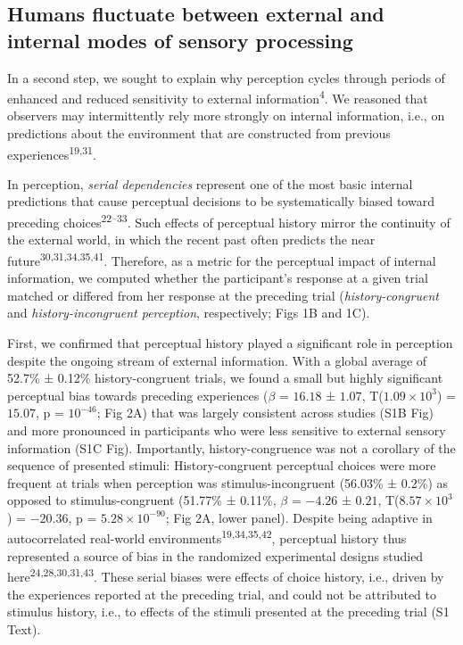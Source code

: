 \documentclass[
]{article}
\begin{document}
\hypertarget{humans-fluctuate-between-external-and-internal-modes-of-sensory-processing}{%
\subsection{Humans fluctuate between external and internal modes of
sensory
processing}\label{humans-fluctuate-between-external-and-internal-modes-of-sensory-processing}}

In a second step, we sought to explain why perception cycles through
periods of enhanced and reduced sensitivity to external
information\textsuperscript{4}. We reasoned that observers may
intermittently rely more strongly on internal information, i.e., on
predictions about the environment that are constructed from previous
experiences\textsuperscript{19,31}.

In perception, \emph{serial dependencies} represent one of the most
basic internal predictions that cause perceptual decisions to be
systematically biased toward preceding choices\textsuperscript{22--33}.
Such effects of perceptual history mirror the continuity of the external
world, in which the recent past often predicts the near
future\textsuperscript{30,31,34,35,41}. Therefore, as a metric for the
perceptual impact of internal information, we computed whether the
participant's response at a given trial matched or differed from her
response at the preceding trial (\emph{history-congruent} and
\emph{history-incongruent perception}, respectively; Figs 1B and 1C).

First, we confirmed that perceptual history played a significant role in
perception despite the ongoing stream of external information. With a
global average of 52.7\% ± 0.12\% history-congruent trials, we found a
small but highly significant perceptual bias towards preceding
experiences (\(\beta\) = \(16.18\) ± \(1.07\),
T(\(\ensuremath{1.09\times 10^{3}}\)) = \(15.07\), p =
\(\ensuremath{10^{-46}}\); Fig 2A) that was largely consistent across
studies (S1B Fig) and more pronounced in participants who
were less sensitive to external sensory information (S1C Fig). Importantly, history-congruence was not a corollary of the sequence
of presented stimuli: History-congruent perceptual choices were more
frequent at trials when perception was stimulus-incongruent (56.03\% ±
0.2\%) as opposed to stimulus-congruent (51.77\% ± 0.11\%, \(\beta\) =
\(-4.26\) ± \(0.21\), T(\(\ensuremath{8.57\times 10^{3}}\)) =
\(-20.36\), p = \(\ensuremath{5.28\times 10^{-90}}\); Fig 2A, lower
panel). Despite being adaptive in autocorrelated real-world
environments\textsuperscript{19,34,35,42}, perceptual history thus
represented a source of bias in the randomized experimental designs
studied here\textsuperscript{24,28,30,31,43}. These serial biases were
effects of choice history, i.e., driven by the experiences reported at
the preceding trial, and could not be attributed to stimulus history,
i.e., to effects of the stimuli presented at the preceding trial
(S1 Text).
\end{document}
